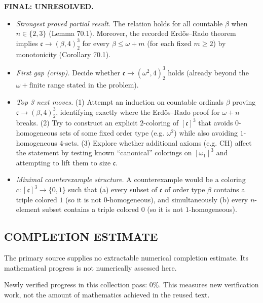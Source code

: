 \medskip
\noindent\textbf{FINAL: \textbf{UNRESOLVED}.}
\begin{itemize}
\item[(i)] \emph{Strongest proved partial result.} The relation holds for all countable $\beta$ when $n\in\{2,3\}$ (Lemma 70.1). Moreover, the recorded Erd\H{o}s--Rado theorem implies $\mathfrak c\to(\beta,4)_2^3$ for every $\beta\le \omega+m$ (for each fixed $m\ge 2$) by monotonicity (Corollary 70.1).
\item[(ii)] \emph{First gap (crisp).} Decide whether $\mathfrak c\to(\omega^2,4)_2^3$ holds (already beyond the $\omega+\text{finite}$ range stated in the problem).
\item[(iii)] \emph{Top 3 next moves.}
(1) Attempt an induction on countable ordinals $\beta$ proving $\mathfrak c\to(\beta,4)_2^3$, identifying exactly where the Erd\H{o}s--Rado proof for $\omega+n$ breaks.
(2) Try to construct an explicit $2$-coloring of $[\mathfrak c]^3$ that avoids $0$-homogeneous sets of some fixed order type (e.g. $\omega^2$) while also avoiding $1$-homogeneous $4$-sets.
(3) Explore whether additional axioms (e.g. CH) affect the statement by testing known ``canonical'' colorings on $[\omega_1]^3$ and attempting to lift them to size $\mathfrak c$.
\item[(iv)] \emph{Minimal counterexample structure.} A counterexample would be a coloring $c:[\mathfrak c]^3\to\{0,1\}$ such that (a) every subset of $\mathfrak c$ of order type $\beta$ contains a triple colored $1$ (so it is not $0$-homogeneous), and simultaneously (b) every $n$-element subset contains a triple colored $0$ (so it is not $1$-homogeneous).
\end{itemize}



\subsection*{COMPLETION ESTIMATE}
The primary source supplies no extractable numerical completion estimate. Its mathematical progress is not numerically assessed here.

Newly verified progress in this collection pass: $0\%$. This measures new verification work, not the amount of mathematics achieved in the reused text.
